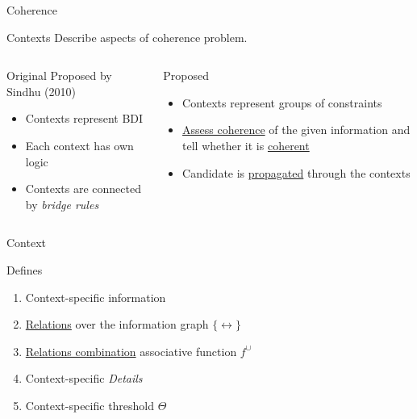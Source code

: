 \begin{frame}{Coherence}
  \begin{block}{Contexts}
    Describe aspects of coherence problem.
    \begin{columns}[t]
      \begin{column}{.5\textwidth}
        \begin{block}{Original}
          Proposed by Sindhu (2010) \\\medskip
          \begin{itemize}
            \item Contexts represent BDI
            \item Each context has own logic
            \item Contexts are connected by
                  \emph{bridge rules}
          \end{itemize}
        \end{block}
      \end{column}
      \begin{column}{.5\textwidth}
        \begin{block}{Proposed}
          \begin{itemize}
            \item Contexts represent groups of constraints
            \item \underline{Assess coherence}
                  of the given information and tell whether
                  it is \underline{coherent}
            \item Candidate is \alert{\underline{propagated}} through
                  the contexts
          \end{itemize}
        \end{block}
      \end{column}
    \end{columns}
  \end{block}
\end{frame}





\begin{frame}{Context}
  \begin{block}{Defines}
    \begin{enumerate}
      \item Context-specific information
      \item \underline{Relations} over the information graph $\{\rel\}$
      \item \underline{Relations combination} associative function $f^\cup$
      \item Context-specific \emph{Details}
      \item Context-specific threshold $\Theta$
    \end{enumerate}
  \end{block}
\end{frame}

